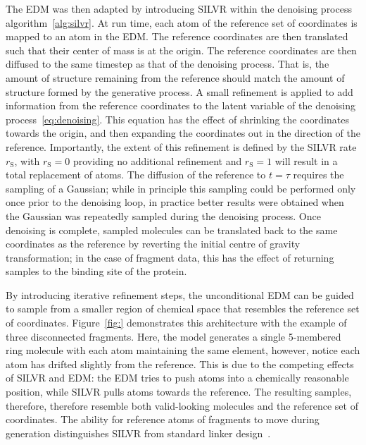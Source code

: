 \documentclass[journal=jacsat,manuscript=article]{achemso}
\begin{document}
The EDM was then adapted by introducing SILVR within the denoising process algorithm~\ref{alg:silvr}. At run time, each atom of the reference set of coordinates is mapped to an atom in the EDM. The reference coordinates are then translated such that their center of mass is at the origin. The reference coordinates are then diffused to the same timestep as that of the denoising process. That is, the amount of structure remaining from the reference should match the amount of structure formed by the generative process. A small refinement is applied to add information from the reference coordinates to the latent variable of the denoising process~\ref{eq:denoising}. This equation has the effect of shrinking the coordinates towards the origin, and then expanding the coordinates out in the direction of the reference. Importantly, the extent of this refinement is defined by the SILVR rate $r_{\mathrm{S}}$, with $r_{\mathrm{S}}=0$ providing no additional refinement and $r_{\mathrm{S}}=1$ will result in a total replacement of atoms. The diffusion of the reference to $t=\tau$ requires the sampling of a Gaussian; while in principle this sampling could be performed only once prior to the denoising loop, in practice better results were obtained when the Gaussian was repeatedly sampled during the denoising process. Once denoising is complete, sampled molecules can be translated back to the same coordinates as the reference by reverting the initial centre of gravity transformation; in the case of fragment data, this has the effect of returning samples to the binding site of the protein.

By introducing iterative refinement steps, the unconditional EDM can be guided to sample from a smaller region of chemical space that resembles the reference set of coordinates. Figure~\ref{fig:} demonstrates this architecture with the example of three disconnected fragments. Here, the model generates a single 5-membered ring molecule with each atom maintaining the same element, however, notice each atom has drifted slightly from the reference. This is due to the competing effects of SILVR and EDM: the EDM tries to push atoms into a chemically reasonable position, while SILVR pulls atoms towards the reference. The resulting samples, therefore, therefore resemble both valid-looking molecules and the reference set of coordinates. The ability for reference atoms of fragments to move during generation distinguishes SILVR from standard linker design~\cite{linkerdesign1, hegeboom_linker}.
\end{document}
